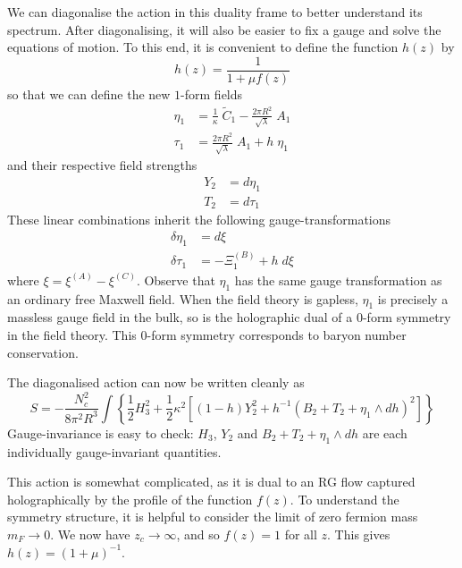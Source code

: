 \documentclass[aps,preprint,nofootinbib,preprintnumbers,eqsecnum,superscriptaddress]{revtex4}
\begin{document}
We can diagonalise the action in this duality frame to better understand its spectrum. After diagonalising, it will also be easier to fix a gauge and solve the equations of motion. To this end, it is convenient to define the function $h(z)$ by
\begin{equation}
	h(z) = \frac{1}{1+\mu f(z)}		\label{h def}
\end{equation}
so that we can define the new $1$-form fields
\begin{subequations}
	\begin{align}
		\eta_1 &= \frac{1}{\kappa} \; \tilde{C}_1 - \frac{2 \pi R^2}{\sqrt{\lambda}} \; A_1 \label{etadef}	\\
		\tau_1 &= \frac{2 \pi R^2}{\sqrt{\lambda}} \; A_1 + h \; \eta_1 \label{taudef}
	\end{align}
\end{subequations}
and their respective field strengths
\begin{subequations}
	\begin{align}
	Y_2 &= d \eta_1		\label{Y2-def}		\\	
	T_2 &= d\tau_1		\label{T2-def}
	\end{align}
\end{subequations}
These linear combinations inherit the following gauge-transformations
\begin{subequations}
	\begin{align}
	\delta \eta_1 &= d\xi		\\
	\delta \tau_1 &= -\Xi_1^{(B)} + h \; d\xi
	\end{align}
\end{subequations}
where $\xi = \xi^{(A)} - \xi^{(C)}$. Observe that $\eta_1$ has the same gauge transformation as an ordinary free Maxwell field. When the field theory is gapless, $\eta_1$ is precisely a massless gauge field in the bulk, so is the holographic dual of a $0$-form symmetry in the field theory. This $0$-form symmetry corresponds to baryon number conservation. 

The diagonalised action can now be written cleanly as
\begin{equation}
	S = -\frac{N_c^2}{8 \pi^2 R^3}\int\left\{\frac{1}{2} H_3^2 + \frac{1}{2} \kappa^2 \left[(1-h) Y_2^2 + h^{-1} \left(B_2 + T_2 + \eta_1 \wedge dh\right)^2 \right] \right\}
\end{equation}
Gauge-invariance is easy to check: $H_3$, $Y_2$ and $B_2 + T_2 + \eta_1 \wedge dh$ are each individually gauge-invariant quantities. 

This action is somewhat complicated, as it is dual to an RG flow captured holographically by the profile of the function $f(z)$. To understand the symmetry structure, it is helpful to consider the limit of zero fermion mass $m_F \to 0$. We now have $z_c \to \infty$, and so $f(z) = 1$ for  all $z$. This gives $h(z) = (1+\mu)^{-1}$.  
\end{document}
